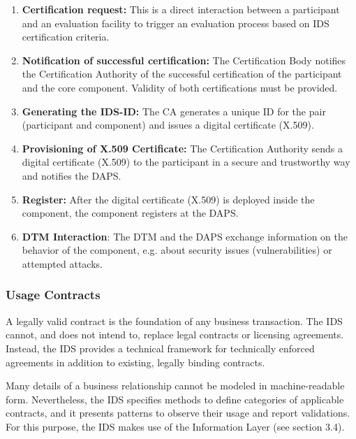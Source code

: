 \begin{enumerate}
	\item \textbf{Certification request:} This is a direct interaction between a participant and an evaluation facility to trigger an evaluation process based on IDS certification criteria.

	\item \textbf{Notification of successful certification:} The Certification Body notifies the Certification Authority of the successful certification of the participant and the core component. Validity of both certifications must be provided.

	\item \textbf{Generating the IDS-ID:} The CA generates a unique ID for the pair (participant and component) and issues a digital certificate (X.509).

	\item \textbf{Provisioning of X.509 Certificate:} The Certification Authority sends a digital certificate (X.509) to the participant in a secure and trustworthy way and notifies the DAPS.

	\item \textbf{Register:} After the digital certificate (X.509) is deployed inside the component, the component registers at the DAPS.

	\item \textbf{DTM Interaction}: The DTM and the DAPS exchange information on the behavior of the component, e.g. about security issues (vulnerabilities) or attempted attacks. 

\end{enumerate}




\subsubsection{Usage Contracts}
A legally valid contract is the foundation of any business transaction. The IDS cannot, and does not intend to, replace legal contracts or licensing agreements. Instead, the IDS provides a technical framework for technically enforced agreements in addition to existing, legally binding contracts.

Many details of a business relationship cannot be modeled in machine-readable form. Nevertheless, the IDS specifies methods to define categories of applicable contracts, and it presents patterns to observe their usage and report validations. For this purpose, the IDS makes use of the Information Layer (see section 3.4). %





